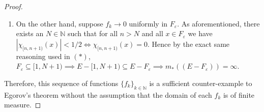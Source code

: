 \begin{proof}
\begin{enumerate}
\begin{enumerate}
		\item On the other hand, suppose \( f_k \to 0 \) uniformly in \( F_\varepsilon  \). As aforementioned, there exists an \( N \in \mathbb{N}  \) such that for all \( n > N \) and all \( x \in F_\varepsilon  \) we have \( |\chi_{[n,n+1)}(x)| < 1 /2 \iff \chi_{[n,n+1)}(x) = 0   \). Hence by the exact same reasoning used in \((\ast)\), \( F_\varepsilon \subseteq [1, N + 1) \implies E - [1, N+1) \subseteq E - F_\varepsilon \implies m_*((E - F_\varepsilon )) = \infty \).
	\end{enumerate}	
\end{enumerate}
Therefore, this sequence of functions \( \{ f_k \} _{k \in \mathbb{N} }  \) is a sufficient counter-example to Egorov's theorem without the assumption that the domain of each \( f_k \) is of finite measure.
\end{proof}
